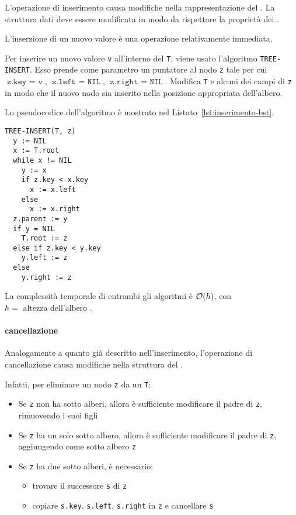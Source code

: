 \documentclass[italian, 10pt]{article}
\begin{document}
L'operazione di inserimento causa modifiche nella rappresentazione del \BST.
La struttura dati deve essere modificata in modo da rispettare la proprietà dei \BST.

L'inserzione di un nuovo valore è una operazione relativamente immediata.

Per inserire un nuovo valore \texttt{v} all'interno del \BST \texttt{T}, viene usato l'algoritmo \texttt{TREE-INSERT}.
Esso prende come parametro un puntatore al nodo \texttt{z} tale per cui \(\texttt{z.key } = \texttt{ v}\), \(\texttt{z.left } = \texttt{ NIL}\), \(\texttt{z.right } = \texttt{ NIL}\).
Modifica \texttt{T} e alcuni dei campi di \texttt{z} in modo che il nuovo nodo sia inserito nella posizione appropriata dell'albero.

Lo pseudocodice dell'algoritmo è mostrato nel Listato~\ref{lst:inserimento-bst}.

\begin{lstlisting}[style=pseudocode, caption={Inserimento di un nuovo nodo}, label={lst:inserimento-bst}]
TREE-INSERT(T, z)
  y := NIL
  x := T.root
  while x != NIL
    y := x
    if z.key < x.key
      x := x.left
    else
      x := x.right
  z.parent := y
  if y = NIL
    T.root := z
  else if z.key < y.key
    y.left := z
  else
    y.right := z
\end{lstlisting}

\bigskip
La complessità temporale di entrambi gli algoritmi è \(\mathcal{O}(h)\), con \(h = \text{ altezza dell'albero }\).

\paragraph{cancellazione}
\label{par:cancellazione-bst}

Analogamente a quanto già descritto nell'inserimento, l'operazione di cancellazione causa modifiche nella struttura del \BST.

Infatti, per eliminare un nodo \texttt{z} da un \BST \texttt{T}:

\begin{itemize}
  \item Se \texttt{z} non ha sotto alberi, allora è sufficiente modificare il padre di \texttt{z}, rimuovendo i suoi figli
  \item Se \texttt{z} ha un solo sotto albero, allora è sufficiente modificare il padre di \texttt{z}, aggiungendo come sotto albero \texttt{z}
  \item Se \texttt{z} ha due sotto alberi, è necessario:
        \begin{itemize}
          \item trovare il successore \texttt{s} di \texttt{z}
          \item copiare \texttt{s.key}, \texttt{s.left}, \texttt{s.right} in \texttt{z} e cancellare \texttt{s}
        \end{itemize}
\end{itemize}
\end{document}
